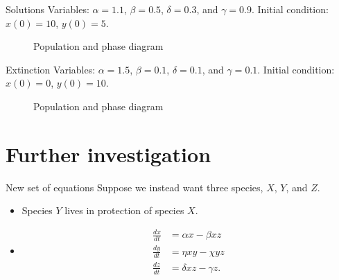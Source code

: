 \documentclass{beamer}
\begin{document}
\begin{frame}{Solutions}
	Variables: $\alpha = 1.1$, $\beta = 0.5$, $\delta = 0.3$, and $\gamma = 0.9$.\newline
	Initial condition: $x(0) = 10$, $y(0) = 5$.
	\begin{figure}
		\centering

		\qquad
	
		\caption{Population and phase diagram}
		\label{fig:3}
	\end{figure}
\end{frame}

\begin{frame}{Extinction}
	Variables: $\alpha = 1.5$, $\beta = 0.1$, $\delta = 0.1$, and $\gamma = 0.1$.\newline
	Initial condition: $x(0) = 0$, $y(0) = 10$.
	\begin{figure}
		\centering

		\qquad
	
		\caption{Population and phase diagram}
		\label{fig: extinction}
	\end{figure}
\end{frame}

\section{Further investigation}

\begin{frame}{New set of equations}
	Suppose we instead want three species, $X$, $Y$, and $Z$.
	\begin{itemize}
		\item<2-> Species $Y$ lives in protection of species $X$.
		\item<3->\begin{align}
		    \frac{dx}{dt} &= \alpha x - \beta xz \nonumber\\
		    \frac{dy}{dt} &= \eta x y - \chi y z \nonumber\\
		    \frac{dz}{dt} &= \delta xz - \gamma z.\label{eq: mod-eq}
		\end{align}
	\end{itemize}

\end{frame}
\end{document}
